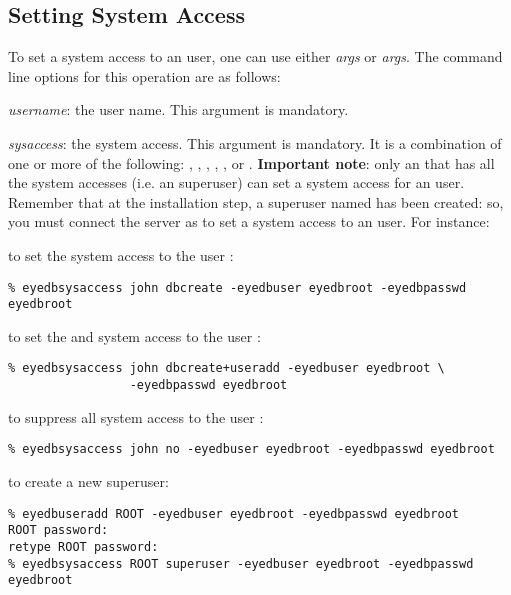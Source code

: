 \subsection{Setting System Access}
To set a system access to an \eyedb user,
one can use either 
\emph{args}
or  \emph{args}.
The command line options for this operation are as follows:
\bi
\item \emph{username}: the user name. This argument is mandatory.
\item \emph{sysaccess}: the system access. This argument is mandatory.
It is a \ttv{+} combination of one or more of the following:
,
, , , ,
 or .
\ei
{\bf Important note}: only an \eyedb that has all the system accesses
(i.e. an \eyedb superuser) can set a system access for an \eyedb user.
Remember that at the installation step, a superuser
named  has been created: so, you must connect the
\eyedb server as  to set a system access to an
\eyedb user.
For instance:
\bi
\item to set the  system access to the user :
\verbsize
\begin{verbatim}
% eyedbsysaccess john dbcreate -eyedbuser eyedbroot -eyedbpasswd eyedbroot
\end{verbatim}
\normalsize
\item to set the  and 
system access to the user :
\verbsize
\begin{verbatim}
% eyedbsysaccess john dbcreate+useradd -eyedbuser eyedbroot \
                 -eyedbpasswd eyedbroot
\end{verbatim}
\normalsize
\item to suppress all system access to the user :
\verbsize
\begin{verbatim}
% eyedbsysaccess john no -eyedbuser eyedbroot -eyedbpasswd eyedbroot
\end{verbatim}
\normalsize
\item to create a new \eyedb superuser:
\verbsize
\begin{verbatim}
% eyedbuseradd ROOT -eyedbuser eyedbroot -eyedbpasswd eyedbroot
ROOT password:
retype ROOT password:
\end{verbatim}
\normalsize
\ei

